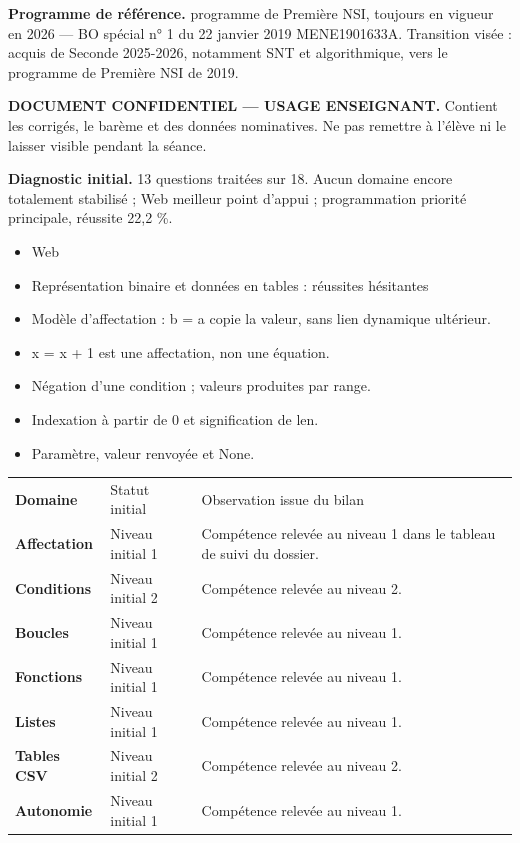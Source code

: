 \documentclass[10pt,a4paper]{article}
\begin{document}
\begin{methodbox}\small\textbf{Programme de référence.} programme de Première NSI, toujours en vigueur en 2026 --- BO spécial n° 1 du 22 janvier 2019 MENE1901633A. Transition visée : acquis de Seconde 2025-2026, notamment SNT et algorithmique, vers le programme de Première NSI de 2019.\end{methodbox}
\begin{keybox}\textbf{DOCUMENT CONFIDENTIEL --- USAGE ENSEIGNANT.} Contient les corrigés, le barème et des données nominatives. Ne pas remettre à l'élève ni le laisser visible pendant la séance.\end{keybox}
\begin{methodbox}
\textbf{Diagnostic initial.} 13 questions traitées sur 18. Aucun domaine encore totalement stabilisé ; Web meilleur point d'appui ; programmation priorité principale, réussite 22,2 \%.
\end{methodbox}
\begin{itemize}\item Web\item Représentation binaire et données en tables : réussites hésitantes\end{itemize}
\begin{itemize}\item Modèle d'affectation : b = a copie la valeur, sans lien dynamique ultérieur.\item x = x + 1 est une affectation, non une équation.\item Négation d'une condition ; valeurs produites par range.\item Indexation à partir de 0 et signification de len.\item Paramètre, valeur renvoyée et None.\end{itemize}
\par\noindent\begin{tabularx}{\linewidth}{>{\bfseries}p{32mm} p{28mm} X}
\rowcolor{Navy}\color{white}Domaine & \color{white}Statut initial & \color{white}Observation issue du bilan \\
Affectation & Niveau initial 1 & Compétence relevée au niveau 1 dans le tableau de suivi du dossier. \\
Conditions & Niveau initial 2 & Compétence relevée au niveau 2. \\
Boucles & Niveau initial 1 & Compétence relevée au niveau 1. \\
Fonctions & Niveau initial 1 & Compétence relevée au niveau 1. \\
Listes & Niveau initial 1 & Compétence relevée au niveau 1. \\
Tables CSV & Niveau initial 2 & Compétence relevée au niveau 2. \\
Autonomie & Niveau initial 1 & Compétence relevée au niveau 1. \\
\end{tabularx}
\end{document}
